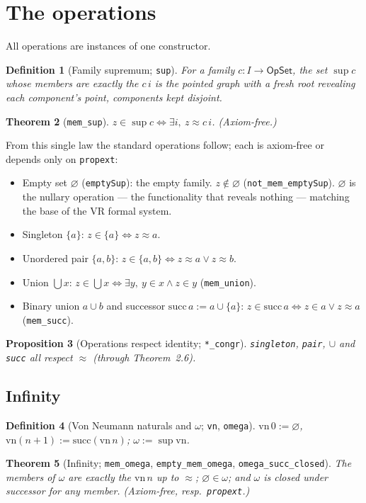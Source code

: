 \documentclass[11pt]{article}
\newtheorem{thm}{Theorem}[section]
\newtheorem{defn}[thm]{Definition}
\newtheorem{prop}[thm]{Proposition}
\theoremstyle{remark}
\newcommand{\OpSet}{\textsf{OpSet}}
\newcommand{\eq}{\approx}
\begin{document}
\section{The operations}
All operations are instances of one constructor.
\begin{defn}[Family supremum; \texttt{sup}]
For a family $c:I\to\OpSet$, the set $\sup c$ whose members are exactly the $c\,i$ is the pointed
graph with a fresh root revealing each component's point, components kept disjoint.
\end{defn}
\begin{thm}[\texttt{mem\_sup}]
$z\in\sup c \iff \exists i,\ z\eq c\,i$. (Axiom-free.)
\end{thm}
From this single law the standard operations follow; each is axiom-free or depends only on
\texttt{propext}:
\begin{itemize}
\item Empty set $\varnothing$ (\texttt{emptySup}): the empty family. $z\notin\varnothing$
(\texttt{not\_mem\_emptySup}). $\varnothing$ is the nullary operation --- the functionality that
reveals nothing --- matching the base of the VR formal system.
\item Singleton $\{a\}$: $z\in\{a\}\iff z\eq a$.
\item Unordered pair $\{a,b\}$: $z\in\{a,b\}\iff z\eq a\vee z\eq b$.
\item Union $\bigcup x$: $z\in\bigcup x\iff\exists y,\ y\in x\wedge z\in y$ (\texttt{mem\_union}).
\item Binary union $a\cup b$ and successor $\mathrm{succ}\,a:=a\cup\{a\}$:
$z\in\mathrm{succ}\,a\iff z\in a\vee z\eq a$ (\texttt{mem\_succ}).
\end{itemize}
\begin{prop}[Operations respect identity; \texttt{*\_congr}]
\texttt{singleton}, \texttt{pair}, $\cup$ and \texttt{succ} all respect $\eq$ (through Theorem~2.6).
\end{prop}

\subsection{Infinity}
\begin{defn}[Von Neumann naturals and $\omega$; \texttt{vn}, \texttt{omega}]
$\mathrm{vn}\,0:=\varnothing$, $\mathrm{vn}(n{+}1):=\mathrm{succ}(\mathrm{vn}\,n)$;
$\omega:=\sup\mathrm{vn}$.
\end{defn}
\begin{thm}[Infinity; \texttt{mem\_omega}, \texttt{empty\_mem\_omega}, \texttt{omega\_succ\_closed}]
The members of $\omega$ are exactly the $\mathrm{vn}\,n$ up to $\eq$; $\varnothing\in\omega$; and
$\omega$ is closed under successor for any member. (Axiom-free, resp.\ \texttt{propext}.)
\end{thm}
\end{document}
